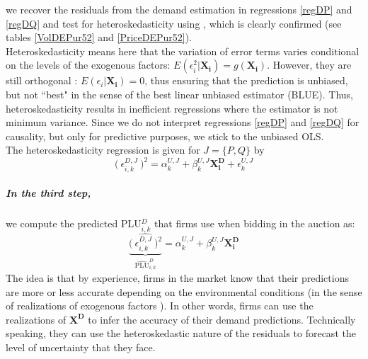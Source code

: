 
we recover the residuals from the demand estimation in regressions \ref{regDP} and \ref{regDQ} and test for heteroskedasticity using \cite{white1980heteroskedasticity}, which is clearly confirmed (see tables \ref{VolDEPur52} and \ref{PriceDEPur52}). \\

Heteroskedasticity means here that the variation of error terms varies conditional on the levels of the exogenous factors: $E(\epsilon_i^2 \vert \boldsymbol{X_i})=g(\boldsymbol{X_i})$. However, they are still orthogonal%
: $E(\epsilon_i \vert \boldsymbol{X_i})=0$, thus ensuring that the prediction is unbiased, but not ``best" in the sense of the best linear unbiased estimator (BLUE). Thus, heteroskedasticity results in inefficient regressions where the estimator is not minimum variance. 
Since we do not interpret regressions \ref{regDP} and \ref{regDQ} for causality, but only for predictive purposes, we stick to the unbiased OLS. \\

The heteroskedasticity regression is given for $J=\{P,Q\}$ by
\begin{equation}
\label{heteroskedeqn}
 \bigl( \: \epsilon_{i,k}^{D,J}\: \bigr)^2= \alpha^{U,J}_{k} + \beta^{U,J}_{k} \boldsymbol{X^D_i} 
 +\epsilon^{U,J}_{k}
\end{equation}



\subparagraph{In the third step,} we compute the predicted PLU$^D_{i,k}$ that firms use when bidding in the auction as:
\begin{equation}
\label{predictu}
 \underbrace{ \widehat{ \bigl( \: \epsilon_{i,k}^{D,J}\: \bigr)^2}}_{\widehat{\text{PLU}}^D_{i,k}}= \alpha^{U,J}_{k} + \beta^{U,J}_{k} \boldsymbol{X^D_i} 
\end{equation}
The idea is that by experience, firms in the market know that their predictions are more or less accurate depending on the environmental conditions (in the sense of realizations of exogenous factors%
). In other words, firms can use the realizations of $ \boldsymbol{X^D}$ to infer the accuracy of their demand predictions. %
 Technically speaking, they can use the heteroskedastic nature of the residuals to forecast the level of uncertainty that they face.\\


